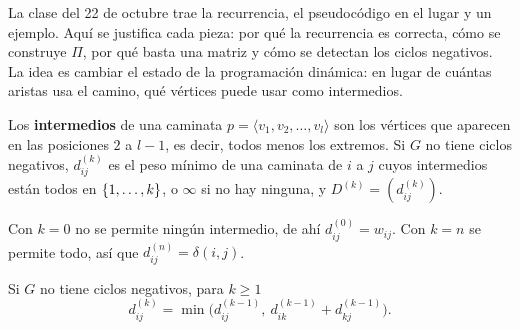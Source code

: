 \documentclass[11pt,letterpaper]{article}
\begin{document}
La clase del 22 de octubre trae la recurrencia, el pseudocódigo en el
lugar y un ejemplo. Aquí se justifica cada pieza: por qué la
recurrencia es correcta, cómo se construye $\Pi$, por qué basta una
matriz y cómo se detectan los ciclos negativos. La idea es cambiar el
estado de la programación dinámica: en lugar de cuántas aristas usa el
camino, qué vértices puede usar como intermedios.

\begin{definicion}
  \label{def:intermedio-floyd}
  Los \textbf{intermedios} de una caminata
  $p = \langle v_1, v_2, \dots, v_l \rangle$ son los vértices que
  aparecen en las posiciones $2$ a $l - 1$, es decir, todos menos los
  extremos. Si $G$ no tiene ciclos negativos, $d^{(k)}_{ij}$ es el
  peso mínimo de una caminata de $i$ a $j$ cuyos intermedios están
  todos en $\left\{ 1, \dots, k \right\}$, o $\infty$ si no hay ninguna, y
  $D^{(k)} = (d^{(k)}_{ij})$.
\end{definicion}

Con $k = 0$ no se permite ningún intermedio, de ahí
$d^{(0)}_{ij} = w_{ij}$. Con $k = n$ se permite todo, así que
$d^{(n)}_{ij} = \delta(i, j)$.

\begin{lema}
  \label{lem:estructura-floyd}
  Si $G$ no tiene ciclos negativos, para $k \ge 1$
  \[
    d^{(k)}_{ij} = \min\bigl( d^{(k-1)}_{ij},\
                   d^{(k-1)}_{ik} + d^{(k-1)}_{kj} \bigr) .
  \]
\end{lema}
\end{document}

